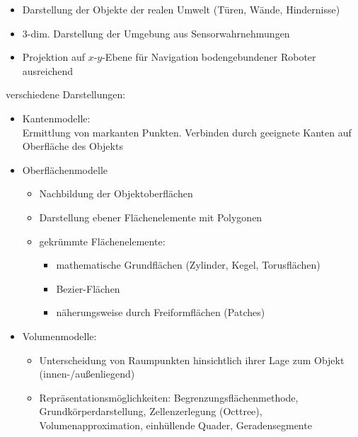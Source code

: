 \begin{itemize}
\item Darstellung der Objekte der realen Umwelt (Türen, Wände, Hindernisse)
\item 3-dim. Darstellung der Umgebung aus Sensorwahrnehmungen
\item Projektion auf $x$-$y$-Ebene für Navigation bodengebundener Roboter ausreichend
\end{itemize}
verschiedene Darstellungen:
\begin{itemize}
\item Kantenmodelle: \\
Ermittlung von markanten Punkten. Verbinden durch geeignete Kanten auf Oberfläche des Objekts
\item Oberflächenmodelle
\begin{itemize}
\item Nachbildung der Objektoberflächen
\item Darstellung ebener Flächenelemente mit Polygonen
\item gekrümmte Flächenelemente:
\begin{itemize}
\item mathematische Grundflächen (Zylinder, Kegel, Torusflächen)
\item Bezier-Flächen
\item näherungsweise durch Freiformflächen (Patches)
\end{itemize}
\end{itemize}
\item Volumenmodelle:
\begin{itemize}
\item Unterscheidung von Raumpunkten hinsichtlich ihrer Lage zum Objekt (innen-/außenliegend)
\item Repräsentationsmöglichkeiten: Begrenzungsflächenmethode, Grundkörperdarstellung, Zellenzerlegung (Octtree), Volumenapproximation, einhüllende Quader, Geradensegmente
\end{itemize}
\end{itemize}




